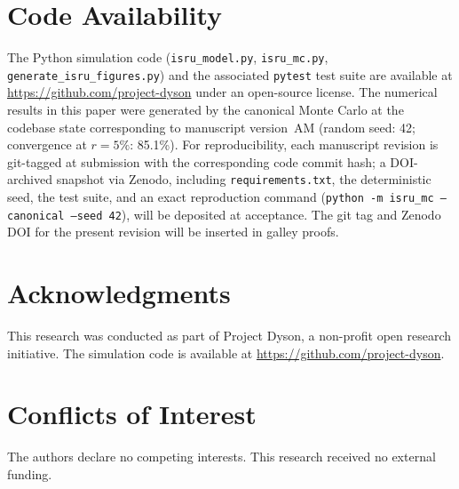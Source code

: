 \section*{Code Availability}

The Python simulation code (\texttt{isru\_model.py}, \texttt{isru\_mc.py}, \texttt{generate\_isru\_figures.py}) and the associated \texttt{pytest} test suite are available at \url{https://github.com/project-dyson} under an open-source license. The numerical results in this paper were generated by the canonical Monte Carlo at the codebase state corresponding to manuscript version~AM (random seed: 42; convergence at $r = 5\%$: 85.1\%). For reproducibility, each manuscript revision is git-tagged at submission with the corresponding code commit hash; a DOI-archived snapshot via Zenodo, including \texttt{requirements.txt}, the deterministic seed, the test suite, and an exact reproduction command (\texttt{python -m isru\_mc --canonical --seed 42}), will be deposited at acceptance. The git tag and Zenodo DOI for the present revision will be inserted in galley proofs.


\section*{Acknowledgments}

This research was conducted as part of Project Dyson, a non-profit open research initiative. The simulation code is available at \url{https://github.com/project-dyson}.

\section*{Conflicts of Interest}

The authors declare no competing interests. This research received no external funding.

